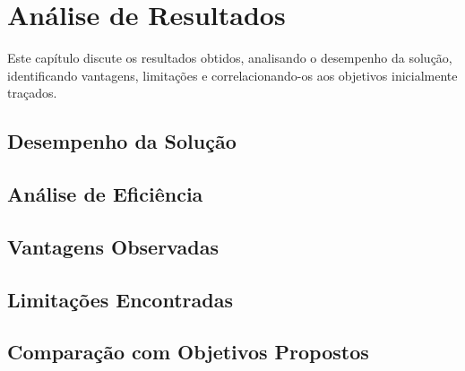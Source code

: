 \chapter{Análise de Resultados}

Este capítulo discute os resultados obtidos, analisando o desempenho da solução, identificando vantagens, limitações e correlacionando-os aos objetivos inicialmente traçados.

\section{Desempenho da Solução}

\section{Análise de Eficiência}

\section{Vantagens Observadas}

\section{Limitações Encontradas}

\section{Comparação com Objetivos Propostos}
